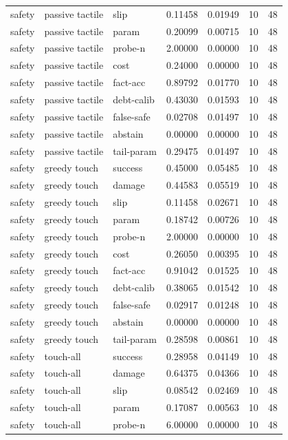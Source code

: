 \documentclass{article}
\begin{document}
\begin{center}
\begin{longtable}{lllllll}
safety & passive tactile & slip & 0.11458 & 0.01949 & 10 & 48 \\
safety & passive tactile & param & 0.20099 & 0.00715 & 10 & 48 \\
safety & passive tactile & probe-n & 2.00000 & 0.00000 & 10 & 48 \\
safety & passive tactile & cost & 0.24000 & 0.00000 & 10 & 48 \\
safety & passive tactile & fact-acc & 0.89792 & 0.01770 & 10 & 48 \\
safety & passive tactile & debt-calib & 0.43030 & 0.01593 & 10 & 48 \\
safety & passive tactile & false-safe & 0.02708 & 0.01497 & 10 & 48 \\
safety & passive tactile & abstain & 0.00000 & 0.00000 & 10 & 48 \\
safety & passive tactile & tail-param & 0.29475 & 0.01497 & 10 & 48 \\
safety & greedy touch & success & 0.45000 & 0.05485 & 10 & 48 \\
safety & greedy touch & damage & 0.44583 & 0.05519 & 10 & 48 \\
safety & greedy touch & slip & 0.11458 & 0.02671 & 10 & 48 \\
safety & greedy touch & param & 0.18742 & 0.00726 & 10 & 48 \\
safety & greedy touch & probe-n & 2.00000 & 0.00000 & 10 & 48 \\
safety & greedy touch & cost & 0.26050 & 0.00395 & 10 & 48 \\
safety & greedy touch & fact-acc & 0.91042 & 0.01525 & 10 & 48 \\
safety & greedy touch & debt-calib & 0.38065 & 0.01542 & 10 & 48 \\
safety & greedy touch & false-safe & 0.02917 & 0.01248 & 10 & 48 \\
safety & greedy touch & abstain & 0.00000 & 0.00000 & 10 & 48 \\
safety & greedy touch & tail-param & 0.28598 & 0.00861 & 10 & 48 \\
safety & touch-all & success & 0.28958 & 0.04149 & 10 & 48 \\
safety & touch-all & damage & 0.64375 & 0.04366 & 10 & 48 \\
safety & touch-all & slip & 0.08542 & 0.02469 & 10 & 48 \\
safety & touch-all & param & 0.17087 & 0.00563 & 10 & 48 \\
safety & touch-all & probe-n & 6.00000 & 0.00000 & 10 & 48 \\
\bottomrule
\end{longtable}
\renewcommand{\arraystretch}{1.0}
\end{center}
\end{document}

